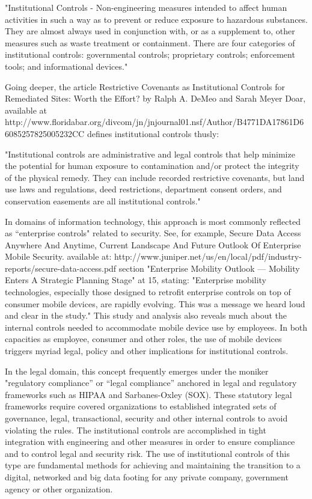 "Institutional Controls - Non-engineering measures intended to affect human activities in such a way as to prevent or reduce exposure to hazardous substances. They are almost always used in conjunction with, or as a supplement to, other measures such as waste treatment or containment. There are four categories of institutional controls: governmental controls; proprietary controls; enforcement tools; and informational devices."

Going deeper, the article Restrictive Covenants as Institutional Controls for Remediated Sites: Worth the Effort? by Ralph A. DeMeo and Sarah Meyer Doar, available at http://www.floridabar.org/divcom/jn/jnjournal01.nsf/Author/B4771DA17861D66085257825005232CC defines institutional controls thusly:

"Institutional controls are administrative and legal controls that help minimize the potential for human exposure to contamination and/or protect the integrity of the physical remedy. They can include recorded restrictive covenants, but land use laws and regulations, deed restrictions, department consent orders, and conservation easements are all institutional controls."

In domains of information technology, this approach is most commonly reflected as “enterprise controls" related to security.
See, for example, Secure Data Access Anywhere And Anytime, Current Landscape And Future Outlook Of Enterprise Mobile Security. available at: http://www.juniper.net/us/en/local/pdf/industry-reports/secure-data-access.pdf section "Enterprise Mobility Outlook — Mobility Enters A Strategic Planning Stage" at 15, stating: "Enterprise mobility technologies, especially those designed to retrofit enterprise controls on top of consumer mobile devices, are rapidly evolving. This was a message we heard loud and clear in the study."
This study and analysis also reveals much about the internal controls needed to accommodate mobile device use by employees.
In both capacities as employee, consumer and other roles, the use of mobile devices triggers myriad legal, policy and other implications for institutional controls.

In the legal domain, this concept frequently emerges under the moniker "regulatory compliance” or “legal compliance” anchored in legal and regulatory frameworks such as HIPAA and Sarbanes-Oxley (SOX).
These statutory legal frameworks require covered organizations to established integrated sets of governance, legal, transactional, security and other internal controls to avoid violating the rules.
The institutional controls are accomplished in tight integration with engineering and other measures in order to ensure compliance and to control legal and security risk.
The use of institutional controls of this type are fundamental methods for achieving and maintaining the transition to a digital, networked and big data footing for any private company, government agency or other organization.

